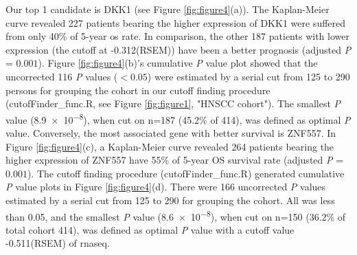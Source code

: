\documentclass[jpm,article,submit,moreauthors,pdftex]{Definitions/mdpi}
\begin{document}
\clearpage


Our top 1 candidate is \acrfull{DKK1} (see Figure \ref{fig:figure4}(a)). The Kaplan-Meier curve revealed 227 patients bearing the higher expression of \acrshort{DKK1} were suffered from only 40\% of 5-year \acrshort{os} rate. In comparison, the other 187 patients with lower expression (the cutoff at -0.312(RSEM)) have been a better prognosis (adjusted \textit{P} = $0.001$).
Figure \ref{fig:figure4}(b)'s cumulative \textit{P} value plot showed that the uncorrected 116 \textit{P} values ($< 0.05$) were estimated by a serial cut from 125 to 290 persons for grouping the cohort in our cutoff finding procedure (cutofFinder\_func.R, see Figure \ref{fig:figure1}, "HNSCC cohort"). The smallest \textit{P} value (\num{8.9e-8}), when cut on n=187 (45.2\% of 414), was defined as optimal \textit{P} value.
Conversely, the most associated gene with better survival is \acrfull{ZNF557}. In Figure \ref{fig:figure4}(c), a Kaplan-Meier curve revealed 264 patients bearing the higher expression of \acrshort{ZNF557} have 55\% of 5-year OS survival rate (adjusted \textit{P} = $0.001$). The cutoff finding procedure (cutofFinder\_func.R) generated cumulative \textit{P} value plots in Figure \ref{fig:figure4}(d). There were 166 uncorrected \textit{P} values estimated by a serial cut from 125 to 290 for grouping the cohort. All was less than 0.05, and the smallest \textit{P} value (\num{8.6e-8}), when cut on n=150 (36.2\% of total cohort 414), was defined as optimal \textit{P} value with a cutoff value -0.511(RSEM) of \acrshort{rnaseq}.
\end{document}
